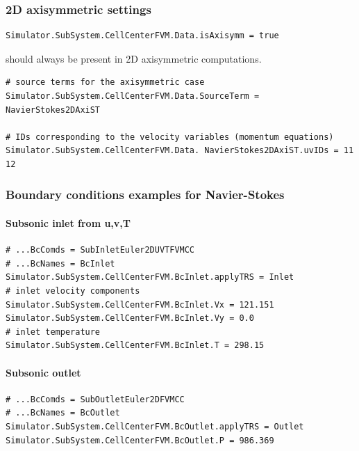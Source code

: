 \documentclass[11pt]{article}
\begin{document}
\subsubsection{2D axisymmetric settings}

\begin{lstlisting}[breaklines]
Simulator.SubSystem.CellCenterFVM.Data.isAxisymm = true
\end{lstlisting}
should always be present in 2D axisymmetric computations. \\

\begin{lstlisting}[breaklines]
# source terms for the axisymmetric case
Simulator.SubSystem.CellCenterFVM.Data.SourceTerm = NavierStokes2DAxiST

# IDs corresponding to the velocity variables (momentum equations) 
Simulator.SubSystem.CellCenterFVM.Data. NavierStokes2DAxiST.uvIDs = 11 12
\end{lstlisting}

\subsubsection{Boundary conditions examples for Navier-Stokes}

\paragraph{Subsonic inlet from u,v,T}

\begin{lstlisting}[breaklines]
# ...BcComds = SubInletEuler2DUVTFVMCC
# ...BcNames = BcInlet
Simulator.SubSystem.CellCenterFVM.BcInlet.applyTRS = Inlet
# inlet velocity components
Simulator.SubSystem.CellCenterFVM.BcInlet.Vx = 121.151
Simulator.SubSystem.CellCenterFVM.BcInlet.Vy = 0.0
# inlet temperature
Simulator.SubSystem.CellCenterFVM.BcInlet.T = 298.15
\end{lstlisting}

\paragraph{Subsonic outlet}

\begin{lstlisting}[breaklines]
# ...BcComds = SubOutletEuler2DFVMCC
# ...BcNames = BcOutlet
Simulator.SubSystem.CellCenterFVM.BcOutlet.applyTRS = Outlet
Simulator.SubSystem.CellCenterFVM.BcOutlet.P = 986.369
\end{lstlisting}
\end{document}
